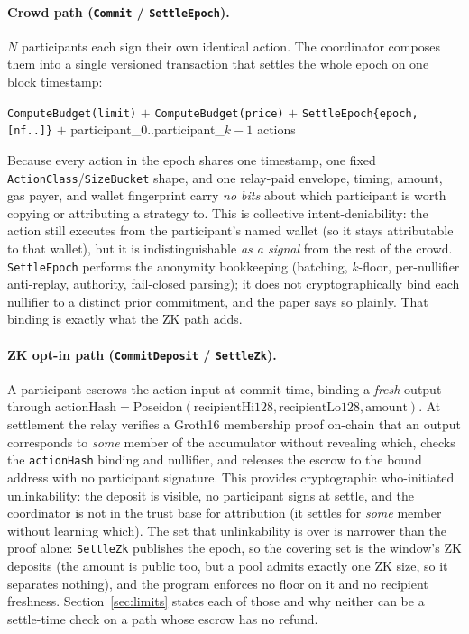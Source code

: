 \documentclass[10pt]{article}
\newcommand{\code}[1]{\texttt{#1}}
\begin{document}
\paragraph{Crowd path (\code{Commit} / \code{SettleEpoch}).} $N$ participants each
sign their own identical action. The coordinator composes them into a single
versioned transaction that settles the whole epoch on one block timestamp:
\begin{center}
\small
\code{ComputeBudget(limit)} $+$ \code{ComputeBudget(price)} $+$
\code{SettleEpoch\{epoch,[nf..]\}} $+$ participant\_0..participant\_{$k{-}1$} actions
\end{center}
Because every action in the epoch shares one timestamp, one fixed
\code{ActionClass}/\code{SizeBucket} shape, and one relay-paid envelope, timing,
amount, gas payer, and wallet fingerprint carry \emph{no bits} about which
participant is worth copying or attributing a strategy to. This is collective
intent-deniability: the action still executes from the participant's named wallet
(so it stays attributable to that wallet), but it is indistinguishable
\emph{as a signal} from the rest of the crowd. \code{SettleEpoch} performs the
anonymity bookkeeping (batching, $k$-floor, per-nullifier anti-replay, authority,
fail-closed parsing); it does not cryptographically bind each nullifier to a
distinct prior commitment, and the paper says so plainly. That binding is exactly
what the ZK path adds.

\paragraph{ZK opt-in path (\code{CommitDeposit} / \code{SettleZk}).} A participant
escrows the action input at commit time, binding a \emph{fresh} output through
$\text{actionHash} = \text{Poseidon}(\text{recipientHi128},
\text{recipientLo128}, \text{amount})$. At settlement the relay verifies a
Groth16 membership proof on-chain that an output corresponds to \emph{some}
member of the accumulator without revealing which, checks the \code{actionHash}
binding and nullifier, and releases the escrow to the bound address with no
participant signature. This provides cryptographic who-initiated unlinkability:
the deposit is visible, no participant signs at settle, and the coordinator is not
in the trust base for attribution (it settles for \emph{some} member without
learning which). The set that unlinkability is over is narrower than the proof
alone: \code{SettleZk} publishes the epoch, so the covering set is the window's ZK
deposits (the amount is public too, but a pool admits exactly one ZK size, so it
separates nothing), and the program enforces no floor on it and no recipient
freshness. Section~\ref{sec:limits} states each of those and why neither can be a
settle-time check on a path whose escrow has no refund.
\end{document}
